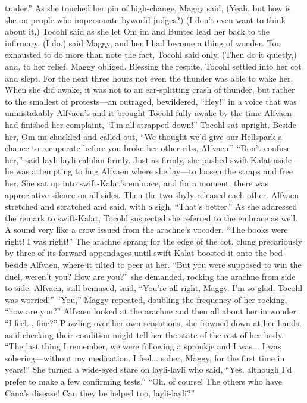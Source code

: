 \documentclass[9pt]{article}
\begin{document}
trader.”
As she touched her pin of high-change, Maggy said, (Yeah, but how is she on people who
impersonate byworld judges?)
(I don’t even want to think about it,) Tocohl said as she let Om im and Buntec lead her back to the
infirmary.
(I do,) said Maggy, and her I had become a thing of wonder.
Too exhausted to do more than note the fact, Tocohl said only, (Then do it quietly,) and, to her relief,
Maggy obliged. Blessing the respite, Tocohl settled into her cot and slept. For the next three hours not
even the thunder was able to wake her.
When she did awake, it was not to an ear-splitting crash of thunder, but rather to the smallest of
protests—an outraged, bewildered, “Hey!” in a voice that was unmistakably Alfvaen’s and it brought
Tocohl fully awake by the time Alfvaen had finished her complaint, “I’m all strapped down!”
Tocohl sat upright. Beside her, Om im chuckled and called out, “We thought we’d give our
Hellspark a chance to recuperate before you broke her other ribs, Alfvaen.”
“Don’t confuse her,” said layli-layli calulan firmly. Just as firmly, she pushed swift-Kalat aside—he
was attempting to hug Alfvaen where she lay—to loosen the straps and free her. She sat up into
swift-Kalat’s embrace, and for a moment, there was appreciative silence on all sides. Then the two shyly
released each other.
Alfvaen stretched and scratched and said, with a sigh, “That’s better.” As she addressed the remark
to swift-Kalat, Tocohl suspected she referred to the embrace as well.
A sound very like a crow issued from the arachne’s vocoder. “The books were right! I was right!”
The arachne sprang for the edge of the cot, clung precariously by three of its forward appendages until
swift-Kalat boosted it onto the bed beside Alfvaen, where it tilted to peer at her. “But you were
supposed to win the duel, weren’t you? How are you?” she demanded, rocking the arachne from side to
side.
Alfvaen, still bemused, said, “You’re all right, Maggy. I’m so glad. Tocohl was worried!”
“You,” Maggy repeated, doubling the frequency of her rocking, “how are you?”
Alfvaen looked at the arachne and then all about her in wonder. “I feel... fine?” Puzzling over her
own sensations, she frowned down at her hands, as if checking their condition might tell her the state of
the rest of her body. “The last thing I remember, we were following a sprookje and I was... I was
sobering—without my medication. I feel... sober, Maggy, for the first time in years!”
She turned a wide-eyed stare on layli-layli who said, “Yes, although I’d prefer to make a few
confirming tests.”
“Oh, of course! The others who have Cana’s disease! Can they be helped too, layli-layli?”
\end{document}
